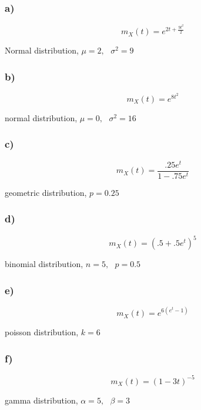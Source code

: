 \documentclass{article}
\begin{document}
\subsubsection*{a)}
\begin{equation}
    m_X(t) = e^{2t+\frac{9t^2}{2}}
\end{equation}
\begin{center}
    Normal distribution,
    $\mu = 2,\text{ }\sigma^2 = 9$
\end{center}
\subsubsection*{b)}
\begin{equation}
    m_X(t) = e^{8t^2}
\end{equation}
\begin{center}
    normal distribution,
    $\mu = 0,\text{ }\sigma^2 = 16$
\end{center}
\subsubsection*{c)}
\begin{equation}
    m_X(t) = \frac{.25e^t}{1-.75e^t}  
\end{equation}
\begin{center}
    geometric distribution,
    $p = 0.25$
\end{center}
\subsubsection*{d)}
\begin{equation}
    m_X(t) = (.5+.5e^t)^5    
\end{equation}
\begin{center}
    binomial distribution,
    $n = 5,\text{ }p = 0.5$
\end{center}
\subsubsection*{e)}
\begin{equation}
    m_X(t) = e^{6(e^t-1)}
\end{equation}
\begin{center}
    poisson distribution,
    $k=6$
\end{center}
\subsubsection*{f)}
\begin{equation}
    m_X(t) = (1-3t)^{-5}
\end{equation}
\begin{center}
    gamma distribution,
    $\alpha = 5,\text{ }\beta = 3$
\end{center}
\end{document}
